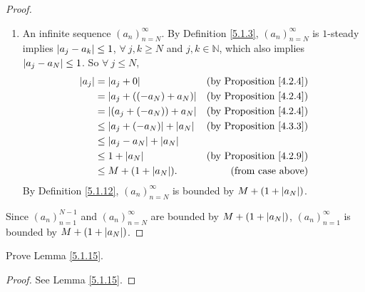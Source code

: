 \begin{proof}
\begin{enumerate}
    \item An infinite sequence \((a_n)_{n = N}^{\infty}\).
    By Definition \ref{5.1.3}, \((a_n)_{n = N}^{\infty}\) is \(1\)-steady implies \(\abs*{a_j - a_k} \leq 1\), \(\forall\ j, k \geq N\) and  \(j, k \in \mathds{N}\), which also implies \(\abs*{a_j - a_N} \leq 1\).
    So \(\forall\ j \leq N\),
    \begin{align*}
    \abs*{a_j} &= \abs*{a_j + 0} & \text{(by Proposition \ref{4.2.4})} \\
    &= \abs*{a_j + ((-a_N) + a_N)} & \text{(by Proposition \ref{4.2.4})} \\
    &= \abs*{(a_j + (-a_N)) + a_N} & \text{(by Proposition \ref{4.2.4})} \\
    &\leq \abs*{a_j + (-a_N)} + \abs*{a_N} & \text{(by Proposition \ref{4.3.3})} \\
    &\leq \abs*{a_j - a_N} + \abs*{a_N} \\
    &\leq 1 + \abs*{a_N} & \text{(by Proposition \ref{4.2.9})} \\
    &\leq M + (1 + \abs*{a_N}). & \text{(from case above)}
    \end{align*}
    By Definition \ref{5.1.12}, \((a_n)_{n = N}^{\infty}\) is bounded by \(M + (1 + \abs*{a_N})\).
\end{enumerate}
Since \((a_n)_{n = 1}^{N - 1}\) and \((a_n)_{n = N}^{\infty}\) are bounded by \(M + (1 + \abs*{a_N})\), \((a_n)_{n = 1}^{\infty}\) is bounded by \(M + (1 + \abs*{a_N})\).
\end{proof}

\exercisesection

\begin{exercise}\label{ex 5.1.1}
Prove Lemma \ref{5.1.15}.
\end{exercise}

\begin{proof}
See Lemma \ref{5.1.15}.
\end{proof}